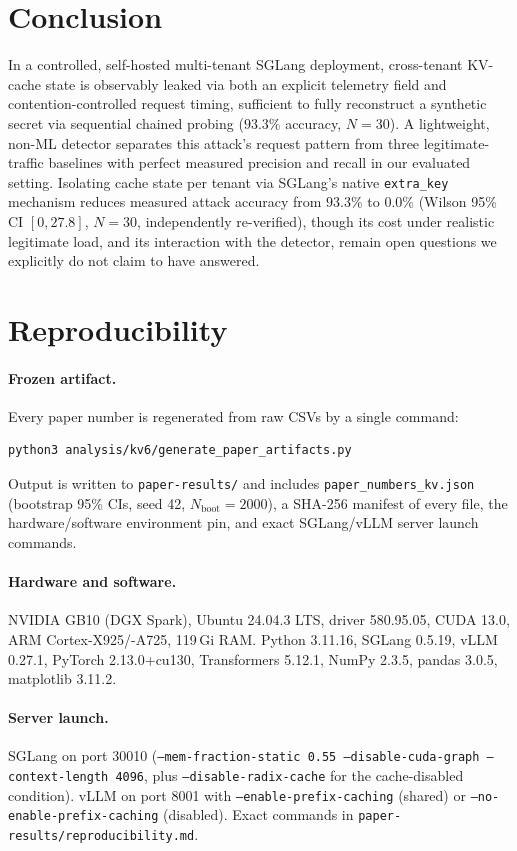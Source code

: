 \documentclass[11pt]{article}
\begin{document}
\section{Conclusion}
In a controlled, self-hosted multi-tenant SGLang deployment, cross-tenant
KV-cache state is observably leaked via both an explicit telemetry field
and contention-controlled request timing, sufficient to fully
reconstruct a synthetic secret via sequential chained probing ($93.3\%$
accuracy, $N{=}30$). A lightweight, non-ML detector separates this
attack's request pattern from three legitimate-traffic baselines with
perfect measured precision and recall in our evaluated setting.
Isolating cache state per tenant via SGLang's native \texttt{extra\_key}
mechanism reduces measured attack accuracy from $93.3\%$ to $0.0\%$ (Wilson 95\% CI $[0, 27.8]$, $N{=}30$,
independently re-verified), though its cost under realistic legitimate
load, and its interaction with the detector, remain open questions we
explicitly do not claim to have answered.

\section{Reproducibility}
\label{sec:repro}
\paragraph{Frozen artifact.} Every paper number is regenerated from raw
CSVs by a single command:
\begin{verbatim}
python3 analysis/kv6/generate_paper_artifacts.py
\end{verbatim}
Output is written to \texttt{paper-results/} and includes
\texttt{paper\_numbers\_kv.json} (bootstrap 95\% CIs, seed 42,
$N_{\text{boot}}{=}2000$), a SHA-256 manifest of every file, the
hardware/software environment pin, and exact SGLang/vLLM server
launch commands.
\paragraph{Hardware and software.} NVIDIA GB10 (DGX Spark),
Ubuntu 24.04.3 LTS, driver 580.95.05, CUDA 13.0, ARM
Cortex-X925/-A725, 119\,Gi RAM. Python 3.11.16, SGLang 0.5.19,
vLLM 0.27.1, PyTorch 2.13.0+cu130, Transformers 5.12.1,
NumPy 2.3.5, pandas 3.0.5, matplotlib 3.11.2.
\paragraph{Server launch.} SGLang on port 30010
(\texttt{--mem-fraction-static 0.55 --disable-cuda-graph
--context-length 4096}, plus \texttt{--disable-radix-cache} for the
cache-disabled condition). vLLM on port 8001 with
\texttt{--enable-prefix-caching} (shared) or
\texttt{--no-enable-prefix-caching} (disabled). Exact commands in
\texttt{paper-results/reproducibility.md}.
\end{document}
